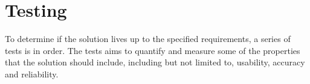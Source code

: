 \section{Testing}
To determine if the solution lives up to the specified requirements, a series of tests is in order. The tests aims to quantify and measure some of the properties that the solution should include, including but not limited to, usability, accuracy and reliability.








